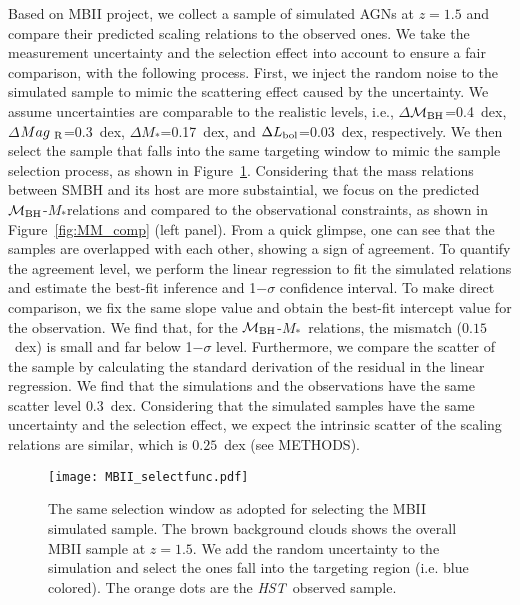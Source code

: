 \documentclass{natureprintstyle}
\newcommand{\hst}{{\it HST}}
\newcommand{\mbh}{$\mathcal M_{\rm BH}$}
\newcommand{\mr}{$Mag_{\rm ~R}$}
\newcommand{\mstar}{{$M_*$}}
\begin{document}
Based on MBII project, we collect a sample of simulated AGNs at $z=1.5$ and compare their predicted scaling relations to the observed ones. We take the measurement uncertainty and the selection effect into account to ensure a fair comparison,  with the following process. First, we inject the random noise to the simulated sample to mimic the scattering effect caused by the uncertainty. We assume uncertainties are comparable to the realistic levels, i.e., $\Delta$\mbh =0.4~dex, $\Delta$\mr=0.3~dex, $\Delta$\mstar=0.17~dex, and $\Delta L_{\rm bol}$=0.03~dex, respectively. We then select the sample that falls into the same targeting window to mimic the sample selection process, as shown in Figure~\ref{fig:selectfunc}. Considering that the mass relations between SMBH and its host are more substaintial, we focus on the predicted \mbh-\mstar relations and compared to the observational constraints, as shown in Figure~\ref{fig:MM_comp} (left panel). From a quick glimpse, one can see that the samples are overlapped with each other, showing a sign of agreement. To quantify the agreement level, we perform the linear regression to fit the simulated relations and estimate the best-fit inference and 1$-\sigma$ confidence interval. To make direct comparison, we fix the same slope value and obtain the best-fit intercept value for the observation. We find that, for the \mbh-\mstar\ relations, the mismatch ($0.15$~dex) is small and far below 1$-\sigma$ level. Furthermore, we compare the scatter of the sample by calculating the standard derivation of the residual in the linear regression. We find that the simulations and the observations have the same scatter level $0.3$~dex. Considering that the simulated samples have the same uncertainty and the selection effect, we expect the intrinsic scatter of the scaling relations are similar, which is $0.25$~dex (see METHODS).

\begin{figure}[t]
\texttt{[image: MBII\_selectfunc.pdf]}
\caption{The same selection window as adopted for selecting the MBII simulated sample. The brown background clouds shows the overall MBII sample at $z=1.5$. We add the random uncertainty to the simulation and select the ones fall into the targeting region (i.e. blue colored). The orange dots are the \hst\ observed sample.}
\label{fig:selectfunc}
\end{figure}
\end{document}
